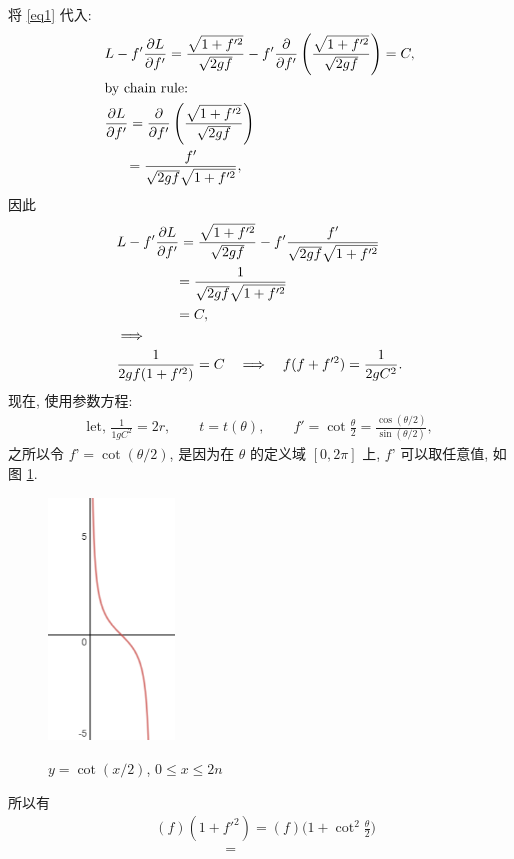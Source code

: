 \documentclass[cn,hazy,blue,14pt,screen]{./cls/elegantnote}
\begin{document}
将 \eqref{eq1} 代入:
\begin{align*}
 	&L - f'\frac{\partial L}{\partial f'}  = \frac{\sqrt{1+f'^2}}{\sqrt{2gf}} - f'\frac{\partial }{\partial f'}\left( \frac{\sqrt{1+f'^2}}{\sqrt{2gf}}\right) = C, \\
 	&\text{by chain rule: }\\
 	&\frac{\partial L}{\partial f'} = \frac{\partial }{\partial f'}\left( \frac{\sqrt{1+f'^2}}{\sqrt{2gf}}\right) \\
 	&\hspace{1.5em} = \frac{f'}{\sqrt{2gf}\sqrt{1+f'^2}},
\end{align*}
因此
\begin{align*}
 	&L - f'\frac{\partial L}{\partial f'} = \frac{\sqrt{1+f'^2}}{\sqrt{2gf}}-f'\frac{f'}{\sqrt{2gf}\sqrt{1+f'^2}}\\
 	&\hspace{4.2em} = \frac{1}{\sqrt{2gf}\sqrt{1+f'^2}} \\
 	&\hspace{4.2em} = C,\\
 	&\Longrightarrow \\
 	&\frac{1}{2gf(1+f'^2)} = C \quad \Longrightarrow\quad f(f+f'^2) = \frac{1}{2gC^2}. 
\end{align*}
现在, 使用参数方程:
\begin{align*}
 	\text{let, } \frac{1}{1gC^2}=2r, \qquad t=t(\theta), \qquad f' = \cot\frac{\theta}{2} = \frac{\cos(\theta/2)}{\sin(\theta/2)},
\end{align*}
之所以令 $ f’ = \cot(\theta/2) $, 是因为在 $\theta$ 的定义域 $ [0, 2\pi] $ 上, $ f’ $ 可以取任意值, 如图 \ref{fig4}.
\begin{figure}[!htbp]
	\centering
	\caption{$ y=\cot(x/2) $, $ 0\leq x \leq 2n $}
	\includegraphics[width=0.3\textwidth]{./figures/4.png}
	\label{fig4}
\end{figure}

所以有
\begin{align*}
 	&(f)(1+f'^2) = (f)\big(1+\cot^2\frac{\theta}{2}\big) \\
 	&\hspace{5em} =
\end{align*}
\end{document}
